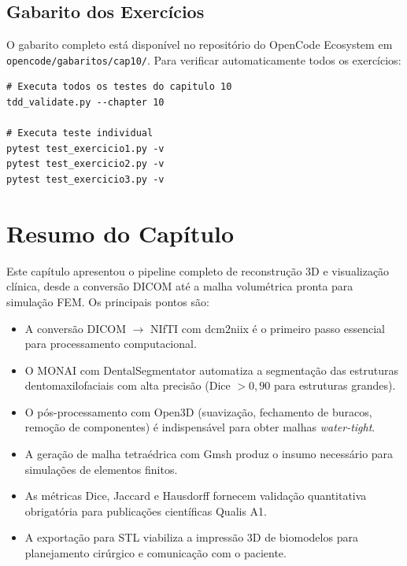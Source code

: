 \subsection{Gabarito dos Exercícios}

O gabarito completo está disponível no repositório do OpenCode
Ecosystem em \texttt{opencode/gabaritos/cap10/}. Para verificar
automaticamente todos os exercícios:

\begin{lstlisting}[style=bashstyle, caption={Verificação automática dos exercícios do Capítulo 10}, label={lst:run_tests}]
# Executa todos os testes do capitulo 10
tdd_validate.py --chapter 10

# Executa teste individual
pytest test_exercicio1.py -v
pytest test_exercicio2.py -v
pytest test_exercicio3.py -v
\end{lstlisting}

\section*{Resumo do Capítulo}
\label{sec:resumo}

Este capítulo apresentou o pipeline completo de reconstrução 3D e
visualização clínica, desde a conversão DICOM até a malha
volumétrica pronta para simulação FEM. Os principais pontos são:

\begin{itemize}
    \item A conversão DICOM $\rightarrow$ NIfTI com dcm2niix é o
        primeiro passo essencial para processamento computacional.
    \item O MONAI com DentalSegmentator automatiza a segmentação
        das estruturas dentomaxilofaciais com alta precisão (Dice
        $>0,90$ para estruturas grandes).
    \item O pós-processamento com Open3D (suavização, fechamento de
        buracos, remoção de componentes) é indispensável para obter
        malhas \textit{water-tight}.
    \item A geração de malha tetraédrica com Gmsh produz o
        insumo necessário para simulações de elementos finitos.
    \item As métricas Dice, Jaccard e Hausdorff fornecem validação
        quantitativa obrigatória para publicações científicas Qualis A1.
    \item A exportação para STL viabiliza a impressão 3D de
        biomodelos para planejamento cirúrgico e comunicação com
        o paciente.
\end{itemize}

